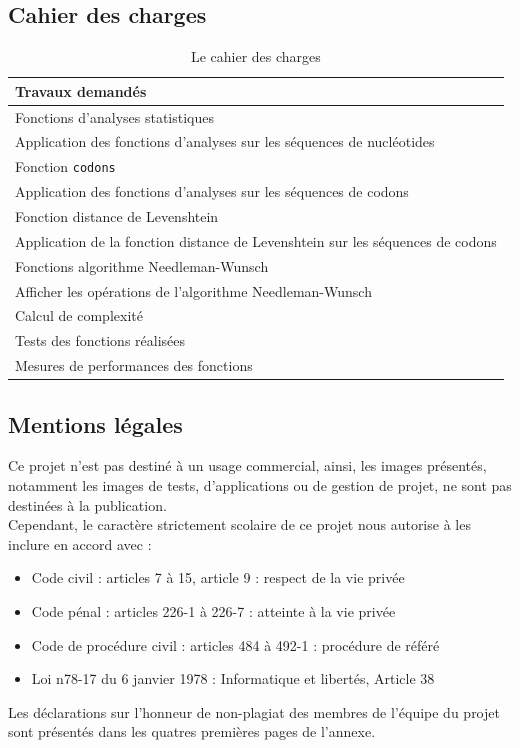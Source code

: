 \documentclass[12pt]{article}
\begin{document}
\subsection*{Cahier des charges}
    \begin{table}[!h]
        \centering
        \begin{tabular}{|l|}
            \hline
            Travaux demandés \\
            \hline
            Fonctions d'analyses statistiques \\
            Application des fonctions d'analyses sur les séquences de nucléotides \\
            Fonction \texttt{codons} \\
            Application des fonctions d'analyses sur les séquences de codons \\
            Fonction distance de Levenshtein \\
            Application de la fonction distance de Levenshtein sur les séquences de codons \\
            Fonctions algorithme Needleman-Wunsch \\
            Afficher les opérations de l'algorithme Needleman-Wunsch \\
            Calcul de complexité \\
            Tests des fonctions réalisées \\
            Mesures de performances des fonctions \\
            \hline
        \end{tabular}
        \caption{Le cahier des charges}
        \label{tab:cdc}
    \end{table}

\subsection*{Mentions légales}
Ce projet n’est pas destiné à un usage commercial, ainsi, les images présentés, notamment les images de tests, d'applications ou de gestion de projet, ne sont pas destinées à la publication. \\
Cependant, le caractère strictement scolaire de ce projet nous autorise à les inclure en accord avec :
\begin{itemize}
\item Code civil : articles 7 à 15, article 9 : respect de la vie privée
\item Code pénal : articles 226-1 à 226-7 : atteinte à la vie privée
\item Code de procédure civil : articles 484 à 492-1 : procédure de référé
\item Loi n78-17 du 6 janvier 1978 : Informatique et libertés, Article 38
\end{itemize}
Les déclarations sur l’honneur de non-plagiat des membres de l’équipe du projet sont présentés dans les quatres premières pages de l'annexe.
\end{document}
